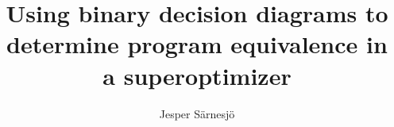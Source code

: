 \documentclass{beamer}
\title{Using binary decision diagrams to determine program equivalence in a superoptimizer}
\author{Jesper Särnesjö}
\date{}
\begin{document}
\begin{frame}
\titlepage
\end{frame}

\begin{frame}
\begin{figure}

\end{figure}
\end{frame}

\begin{frame}
\begin{figure}

\end{figure}
\end{frame}

\begin{frame}
\begin{figure}

\end{figure}
\end{frame}

\begin{frame}
\begin{figure}

\end{figure}
\end{frame}

\begin{frame}
\begin{figure}

\end{figure}
\end{frame}

\begin{frame}
\begin{figure}

\end{figure}
\end{frame}

\begin{frame}
\begin{figure}

\end{figure}
\end{frame}

\begin{frame}
\begin{figure}

\end{figure}
\end{frame}

\begin{frame}
\begin{figure}

\end{figure}
\end{frame}
\end{document}
